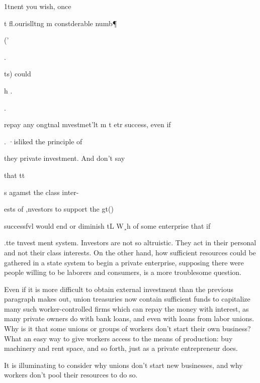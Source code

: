 \documentclass[11pt,openany]{book}
\begin{document}
1tnent you wish, once 

t fl.ourislltng m constderable numb¶ 

(' 

. 

ts) could 

h . 

. 

repay any ongtnal mvestmet'lt m t etr success, even if 

. ·isliked the principle of 

they private investment. And don't say 

that tt 

s agamst the class inter-

ests of ,nvestors to support the gt() 

successfvl would end or diminish tL W¸h of some enterprise that if 

.tte tnvest ment system. Investors are not so altruistic. They act in their personal and not their class interests. On the other hand, how sufficient resources could be gathered in a state system to begin a private enterprise, supposing there were people willing to be laborers and consumers, is a more troublesome question. 

Even if it is more difficult to obtain external investment than the previous paragraph makes out, union treasuries now contain sufficient funds to capitalize many such worker-controlled firms which can repay the money with interest, as many private owners do with bank loans, and even with loans from labor unions. Why is it that some unions or groups of workers don't start their own business? What an easy way to give workers access to the means of production: buy machinery and rent space, and so forth, just as a private entrepreneur does. 

It is illuminating to consider why unions don't start new businesses, and why workers don't pool their resources to do so. 
\end{document}
